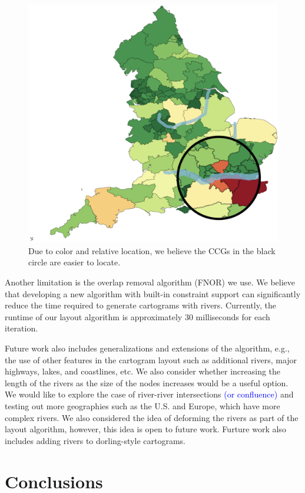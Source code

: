 \documentclass[Afour,sagev,times]{sagej}
\newcommand{\new}[1]{\textcolor{blue}{#1}}
\begin{document}
    {
        \begin{figure}[tb!]
            \centering
            \includegraphics[width=0.8\columnwidth,keepaspectratio]{extreme.png}
            \caption{Due to color and relative location, we believe the CCGs in the black circle are easier to locate.}
            \label{fig:extreme}
        \end{figure}
    }

Another limitation is the overlap removal algorithm (FNOR) we use.
We believe that developing a new algorithm with built-in constraint support can significantly reduce the time required to generate cartograms with rivers. Currently, the runtime of our layout algorithm is approximately 30 milliseconds for each iteration.

Future work also includes generalizations and extensions of the algorithm, e.g., the use of other features in the cartogram layout such as additional rivers, major highways, lakes, and coastlines, etc.
We also consider whether increasing the length of the rivers as the size of the nodes increases would be a useful option.
We would like to explore the case of river-river intersections \new{(or confluence)} and testing out more geographies such as the U.S. and Europe, which have more complex rivers.
We also considered the idea of deforming the rivers as part of the layout algorithm, however, this idea is open to future work.
Furture work also includes adding rivers to dorling-style cartograms.


\section{Conclusions}\label{sec:{Conclusions}}
\end{document}
